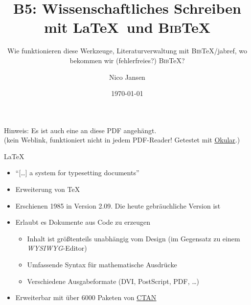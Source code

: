 \documentclass[aspectratio=169]{beamer}
\title{B5: Wissenschaftliches Schreiben mit \LaTeX~und \textsc{Bib}\TeX}
\subtitle{Wie funktionieren diese Werkzeuge, Literaturverwaltung mit
\textsc{Bib}\TeX/jabref, wo bekommen wir (fehlerfreies?)
\textsc{Bib}\TeX?}
\author{Nico Jansen}
\date{\today}
\newif\iflightmode
\providecommand{\tightlist}{\setlength{\itemsep}{0pt}\setlength{\parskip}{0pt}}
\newcommand\citestyle[1]{\textcolor{foreground-secondary}{\textsuperscript{#1}}}
\let\oldautocite\autocite
\renewcommand{\autocite}[1]{\citestyle{\oldautocite{#1}}}
\begin{document}
        \begin{frame}
            \maketitle
            \iflightmode
            \else
                \textcolor{foreground-secondary}{
                    Hinweis: Es ist auch eine 
                    an diese PDF angehängt. \\
                    (kein Weblink, funktioniert nicht in jedem PDF-Reader! Getestet mit \href{https://okular.kde.org)}{\alert{\underline{Okular}}}.)
                }
            \fi
        \end{frame}

    
        
    \begin{frame}{\LaTeX}
    \protect\hypertarget{section}{}
    \begin{itemize}
    \tightlist
    \item
      \enquote{[\ldots] a system for typesetting documents}\autocite{latex}
    \item
      Erweiterung von \TeX\autocite{latex}
    \item
      Erschienen 1985 in Version 2.09. Die heute gebräuchliche Version
      ist \autocite{latex}
    \item
      Erlaubt es Dokumente aus Code zu erzeugen\autocite{latex}

      \begin{itemize}
      \tightlist
      \item
        Inhalt ist größtenteils unabhängig vom Design (im Gegensatz zu
        einem \emph{WYSIWYG}-Editor)\autocite{latex}
      \item
        Umfassende Syntax für mathematische Ausdrücke\autocite{latex}
      \item
        Verschiedene Ausgabeformate (DVI\autocite{latex},
        PostScript\autocite{ctan-dvips}, PDF\autocite{ctan-dvipdfmx},
        \ldots)
      \end{itemize}
    \item
      Erweiterbar mit über 6000 Paketen von
      \href{https://ctan.org}{\alert{\underline{CTAN}}}\autocite{ctan}
    \end{itemize}
    \end{frame}
\end{document}
